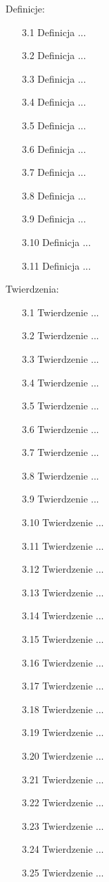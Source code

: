 Definicje: \begin{enumerate}
\item [3.1] Definicja ...
\item [3.2] Definicja ...
\item [3.3] Definicja ...
\item [3.4] Definicja ...
\item [3.5] Definicja ...
\item [3.6] Definicja ...
\item [3.7] Definicja ...
\item [3.8] Definicja ...
\item [3.9] Definicja ...
\item [3.10] Definicja ...
\item [3.11] Definicja ...
\end{enumerate} Twierdzenia: \begin{enumerate}
\item [3.1] Twierdzenie ...
\item [3.2] Twierdzenie ...
\item [3.3] Twierdzenie ...
\item [3.4] Twierdzenie ...
\item [3.5] Twierdzenie ...
\item [3.6] Twierdzenie ...
\item [3.7] Twierdzenie ...
\item [3.8] Twierdzenie ...
\item [3.9] Twierdzenie ...
\item [3.10] Twierdzenie ...
\item [3.11] Twierdzenie ...
\item [3.12] Twierdzenie ...
\item [3.13] Twierdzenie ...
\item [3.14] Twierdzenie ...
\item [3.15] Twierdzenie ...
\item [3.16] Twierdzenie ...
\item [3.17] Twierdzenie ...
\item [3.18] Twierdzenie ...
\item [3.19] Twierdzenie ...
\item [3.20] Twierdzenie ...
\item [3.21] Twierdzenie ...
\item [3.22] Twierdzenie ...
\item [3.23] Twierdzenie ...
\item [3.24] Twierdzenie ...
\item [3.25] Twierdzenie ...

\end{enumerate}
